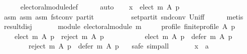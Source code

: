 \begin{isabellebody}
\ \ \ \ \isamarkupfalse%
\ electoral{\isacharunderscore}{\kern0pt}module{\isacharunderscore}{\kern0pt}def\isanewline
\ \ \ \ \isamarkupfalse%
\ auto\isanewline
\ \ \isamarkupfalse%
\ {\isachardoublequoteopen}x\ {\isasymin}\ elect\ m\ A\ p{\isachardoublequoteclose}\isanewline
\ \ \ \ \isamarkupfalse%
\ asm{}\ asm{}\ asm{}\ fst{\isacharunderscore}{\kern0pt}conv\ partit\isanewline
\ \ \ \ \ \ \ \ \ \ set{\isacharunderscore}{\kern0pt}partit\ snd{\isacharunderscore}{\kern0pt}conv\ Un{\isacharunderscore}{\kern0pt}iff\isanewline
\ \ \ \ \isamarkupfalse%
\ metis\isanewline
{}\isamarkupfalse%
%
\endisatagproof
{\isafoldproof}%
%
\isadelimproof
\isanewline
%
\endisadelimproof
\isanewline
{}\isamarkupfalse%
\ result{\isacharunderscore}{\kern0pt}disj{\isacharcolon}{\kern0pt}\isanewline
\ \ \isanewline
\ \ \ \ module{\isacharcolon}{\kern0pt}\ {\isachardoublequoteopen}electoral{\isacharunderscore}{\kern0pt}module\ m{\isachardoublequoteclose}\ \isanewline
\ \ \ \ profile{\isacharcolon}{\kern0pt}\ {\isachardoublequoteopen}finite{\isacharunderscore}{\kern0pt}profile\ A\ p{\isachardoublequoteclose}\isanewline
\ \ \isanewline
\ \ \ \ {\isachardoublequoteopen}{\isacharparenleft}{\kern0pt}elect\ m\ A\ p{\isacharparenright}{\kern0pt}\ {\isasyminter}\ {\isacharparenleft}{\kern0pt}reject\ m\ A\ p{\isacharparenright}{\kern0pt}\ {\isacharequal}{\kern0pt}\ {\isacharbraceleft}{\kern0pt}{\isacharbraceright}{\kern0pt}\ {\isasymand}\isanewline
\ \ \ \ \ \ \ \ {\isacharparenleft}{\kern0pt}elect\ m\ A\ p{\isacharparenright}{\kern0pt}\ {\isasyminter}\ {\isacharparenleft}{\kern0pt}defer\ m\ A\ p{\isacharparenright}{\kern0pt}\ {\isacharequal}{\kern0pt}\ {\isacharbraceleft}{\kern0pt}{\isacharbraceright}{\kern0pt}\ {\isasymand}\isanewline
\ \ \ \ \ \ \ \ {\isacharparenleft}{\kern0pt}reject\ m\ A\ p{\isacharparenright}{\kern0pt}\ {\isasyminter}\ {\isacharparenleft}{\kern0pt}defer\ m\ A\ p{\isacharparenright}{\kern0pt}\ {\isacharequal}{\kern0pt}\ {\isacharbraceleft}{\kern0pt}{\isacharbraceright}{\kern0pt}{\isachardoublequoteclose}\isanewline
%
\isadelimproof
%
\endisadelimproof
%
\isatagproof
{}\isamarkupfalse%
\ {\isacharparenleft}{\kern0pt}safe{\isacharcomma}{\kern0pt}\ simp{\isacharunderscore}{\kern0pt}all{\isacharparenright}{\kern0pt}\isanewline
\ \ \isamarkupfalse%
\isanewline
\ \ \ \ x\ {\isacharcolon}{\kern0pt}{\isacharcolon}{\kern0pt}\ {\isachardoublequoteopen}{\isacharprime}{\kern0pt}a{\isachardoublequoteclose}\isanewline

\end{isabellebody}

